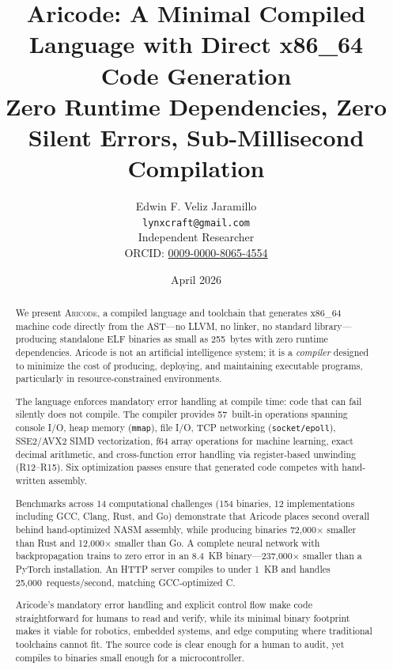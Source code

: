 \documentclass[11pt,a4paper]{article}
\title{\textbf{Aricode: A Minimal Compiled Language with Direct x86\_64 Code Generation}\\[0.5em]
\large Zero Runtime Dependencies, Zero Silent Errors, Sub-Millisecond Compilation}
\author{
Edwin F. Veliz Jaramillo\\
\texttt{lynxcraft@gmail.com}\\[0.5em]
Independent Researcher\\[0.3em]
ORCID: \href{https://orcid.org/0009-0000-8065-4554}{0009-0000-8065-4554}
}
\date{April 2026}
\begin{document}
\maketitle

\noindent{}\vspace{1em}

\begin{abstract}
We present \textsc{Aricode}, a compiled language and toolchain that generates x86\_64 machine code directly from the AST---no LLVM, no linker, no standard library---producing standalone ELF binaries as small as 255~bytes with zero runtime dependencies. Aricode is not an artificial intelligence system; it is a \emph{compiler} designed to minimize the cost of producing, deploying, and maintaining executable programs, particularly in resource-constrained environments.

The language enforces mandatory error handling at compile time: code that can fail silently does not compile. The compiler provides 57~built-in operations spanning console I/O, heap memory (\texttt{mmap}), file I/O, TCP networking (\texttt{socket/epoll}), SSE2/AVX2 SIMD vectorization, f64 array operations for machine learning, exact decimal arithmetic, and cross-function error handling via register-based unwinding (R12--R15). Six optimization passes ensure that generated code competes with hand-written assembly.

Benchmarks across 14 computational challenges (154 binaries, 12 implementations including GCC, Clang, Rust, and Go) demonstrate that Aricode places second overall behind hand-optimized NASM assembly, while producing binaries 72{,}000$\times$ smaller than Rust and 12{,}000$\times$ smaller than Go. A complete neural network with backpropagation trains to zero error in an 8.4~KB binary---237{,}000$\times$ smaller than a PyTorch installation. An HTTP server compiles to under 1~KB and handles 25{,}000~requests/second, matching GCC-optimized C.

Aricode's mandatory error handling and explicit control flow make code straightforward for humans to read and verify, while its minimal binary footprint makes it viable for robotics, embedded systems, and edge computing where traditional toolchains cannot fit. The source code is clear enough for a human to audit, yet compiles to binaries small enough for a microcontroller.
\end{abstract}
\end{document}
